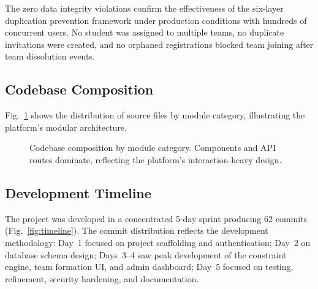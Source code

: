 \documentclass[conference]{IEEEtran}
\begin{document}
The zero data integrity violations confirm the effectiveness of the six-layer duplication prevention framework under production conditions with hundreds of concurrent users. No student was assigned to multiple teams, no duplicate invitations were created, and no orphaned registrations blocked team joining after team dissolution events.

\subsection{Codebase Composition}

Fig.~\ref{fig:codebase} shows the distribution of source files by module category, illustrating the platform's modular architecture.

\begin{figure}[htbp]
\centering
{}
\caption{Codebase composition by module category. Components and API routes dominate, reflecting the platform's interaction-heavy design.}
\label{fig:codebase}
\end{figure}

\subsection{Development Timeline}

The project was developed in a concentrated 5-day sprint producing 62 commits (Fig.~\ref{fig:timeline}). The commit distribution reflects the development methodology: Day~1 focused on project scaffolding and authentication; Day~2 on database schema design; Days~3--4 saw peak development of the constraint engine, team formation UI, and admin dashboard; Day~5 focused on testing, refinement, security hardening, and documentation.
\end{document}
